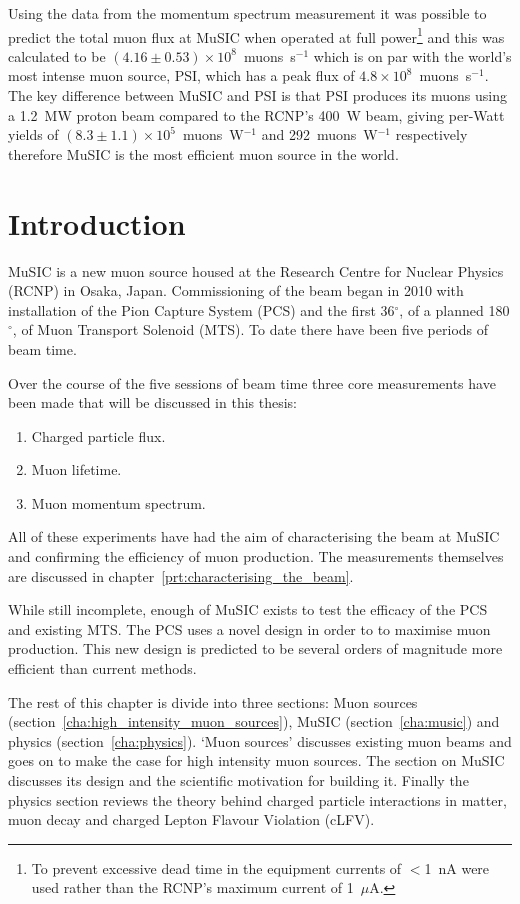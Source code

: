 Using the data from the momentum spectrum measurement it was possible to predict the total muon flux at MuSIC when operated at full power\footnote{To prevent excessive dead time in the equipment currents of \(<\)1~nA were used rather than the RCNP's maximum current of 1~\(\mu\)A.} and this was calculated to be \((4.16\pm0.53)\times10^8\)~muons~s\(^{-1}\) which is on par with the world's most intense muon source, PSI, which has a peak flux of \(4.8\times10^8\)~muons~s\(^{-1}\). The key difference between MuSIC and PSI is that PSI produces its muons using a 1.2~MW proton beam compared to the RCNP's 400~W beam, giving per-Watt yields of \((8.3\pm1.1)\times10^5\)~muons~W\(^{-1}\) and 292~muons~W\(^{-1}\) respectively therefore MuSIC is the most efficient muon source in the world.

\chapter{Introduction} %
\label{prt:introduction}
MuSIC is a new muon source housed at the Research Centre for Nuclear Physics (RCNP) in Osaka, Japan. Commissioning of the beam began in 2010 with installation of the Pion Capture System (PCS) and the first 36\(^{\circ}\), of a planned 180\(^{\circ}\), of Muon Transport Solenoid (MTS). To date there have been five periods of beam time.

Over the course of the five sessions of beam time three core measurements have been made that will be discussed in this thesis:
\begin{enumerate}
  \item Charged particle flux.
  \item Muon lifetime.
  \item Muon momentum spectrum.
\end{enumerate}
All of these experiments have had the aim of characterising the beam at MuSIC and confirming the efficiency of muon production. The measurements themselves are discussed in chapter~\ref{prt:characterising_the_beam}.

While still incomplete, enough of MuSIC exists to test the efficacy of the PCS and existing MTS. The PCS uses a novel design in order to to maximise muon production. This new design is predicted to be several orders of magnitude more efficient than current methods.

The rest of this chapter is divide into three sections: Muon sources (section~\ref{cha:high_intensity_muon_sources}), MuSIC (section~\ref{cha:music}) and physics (section~\ref{cha:physics}). `Muon sources' discusses existing muon beams and goes on to make the case for high intensity muon sources. The section on MuSIC discusses its design and the scientific motivation for building it. Finally the physics section reviews the theory behind charged particle interactions in matter, muon decay and charged Lepton Flavour Violation (cLFV).

